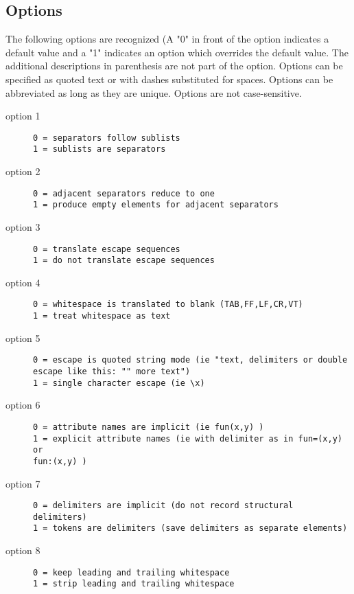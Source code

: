 \subsection{Options}
The following options are recognized (A "0" in front of the option indicates a default value and a "1" indicates an option which overrides the default value. The additional descriptions in parenthesis are not part of the option. Options can be specified as quoted text or with dashes substituted for spaces. Options can be abbreviated as long as they are unique. Options are not case-sensitive.
\begin{description}
\item[option 1]
\begin{verbatim}
0 = separators follow sublists
1 = sublists are separators
\end{verbatim}
\item[option 2]
\begin{verbatim}
0 = adjacent separators reduce to one
1 = produce empty elements for adjacent separators
\end{verbatim}
\item[option 3]
\begin{verbatim}
0 = translate escape sequences
1 = do not translate escape sequences
\end{verbatim}
\item[option 4]
\begin{verbatim}
0 = whitespace is translated to blank (TAB,FF,LF,CR,VT)
1 = treat whitespace as text
\end{verbatim}
\item[option 5]
\begin{verbatim}
0 = escape is quoted string mode (ie "text, delimiters or double escape like this: "" more text")
1 = single character escape (ie \x)
\end{verbatim}
\item[option 6]
\begin{verbatim}
0 = attribute names are implicit (ie fun(x,y) )
1 = explicit attribute names (ie with delimiter as in fun=(x,y) or
fun:(x,y) )
\end{verbatim}
\item[option 7]
\begin{verbatim}
0 = delimiters are implicit (do not record structural delimiters)
1 = tokens are delimiters (save delimiters as separate elements)
\end{verbatim}
\item[option 8]
\begin{verbatim}
0 = keep leading and trailing whitespace
1 = strip leading and trailing whitespace
\end{verbatim}
\end{description}
